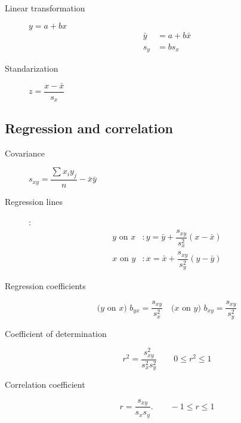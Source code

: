 \begin{multicols*}{2}
\begin{tcolorbox}[hbox, title=Linear transformations]
\begin{minipage}{0.4\textwidth}
\begin{description}
\item[Linear transformation] $y=a+bx$
      \begin{align*}
      \bar y & = a+b\bar x \\
      s_y    & = bs_x
      \end{align*}
\item[Standarization] $z=\dfrac{x-\bar x}{s_x}$
\end{description}
\end{minipage}
\end{tcolorbox}


\subsection*{Regression and correlation}

\begin{tcolorbox}[hbox, title=Linear regression]
\begin{minipage}{0.4\textwidth}
\begin{description}
\item [Covariance] $s_{xy}=\dfrac{\sum x_iy_j}{n}-\bar{x}\bar{y}$
\item [Regression lines]:
      \begin{align*}
      \mbox{$y$ on $x$} & : y=\bar{y}+\dfrac{s_{xy}}{s_x^2}(x-\bar{x}) \\
      \mbox{$x$ on $y$} & : x=\bar{x}+\dfrac{s_{xy}}{s_y^2}(y-\bar{y})
      \end{align*}
\item [Regression coefficients]
      \[
      \mbox{($y$ on $x$) } b_{yx}=\dfrac{s_{xy}}{s_x^2}\quad \mbox{($x$ on
      $y$) } b_{xy}=\dfrac{s_{xy}}{s_y^2}
      \]
\item[Coefficient of determination]
      \[r^2=\dfrac{s_{xy}^2}{s_x^2s_y^2} \qquad 0\leq r^2\leq 1\]
\item[Correlation coefficient]
      \[r=\dfrac{s_{xy}}{s_xs_y}.\qquad -1\leq r\leq 1\]
\end{description}
\end{minipage}
\end{tcolorbox}

\medskip


\end{multicols*}
